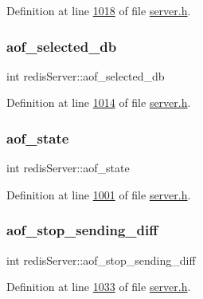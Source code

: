 Definition at line \hyperlink{server_8h_source_l01018}{1018} of file \hyperlink{server_8h_source}{server.\+h}.

\mbox{\label{structredisServer_ac4105f82295047de0ec26a24839077a9}} 
\subsubsection{\texorpdfstring{aof\+\_\+selected\+\_\+db}{aof\_selected\_db}}
{\footnotesize\ttfamily int redis\+Server\+::aof\+\_\+selected\+\_\+db}



Definition at line \hyperlink{server_8h_source_l01014}{1014} of file \hyperlink{server_8h_source}{server.\+h}.

\mbox{\label{structredisServer_a270897ee49d52a6425194e9b62f7fddb}} 
\subsubsection{\texorpdfstring{aof\+\_\+state}{aof\_state}}
{\footnotesize\ttfamily int redis\+Server\+::aof\+\_\+state}



Definition at line \hyperlink{server_8h_source_l01001}{1001} of file \hyperlink{server_8h_source}{server.\+h}.

\mbox{\label{structredisServer_a6386fd215afa82ac446e6fb3d9405b8d}} 
\subsubsection{\texorpdfstring{aof\+\_\+stop\+\_\+sending\+\_\+diff}{aof\_stop\_sending\_diff}}
{\footnotesize\ttfamily int redis\+Server\+::aof\+\_\+stop\+\_\+sending\+\_\+diff}



Definition at line \hyperlink{server_8h_source_l01033}{1033} of file \hyperlink{server_8h_source}{server.\+h}.

